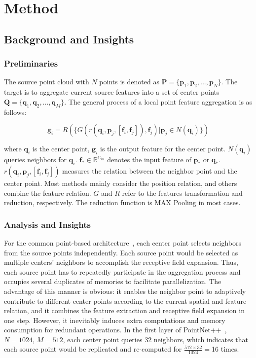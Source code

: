\documentclass[journal]{IEEEtran}
\begin{document}
\section{Method}

\subsection{Background and Insights}
\label{sec:analysis}

\subsubsection{Preliminaries} The source point cloud with $N$ points is denoted as $\mathbf{P}=\{\mathbf{p}_1, \mathbf{p}_2, ..., \mathbf{p}_N\}$. The target is to aggregate current source features into a set of center points $\mathbf{Q}=\{\mathbf{q}_1, \mathbf{q}_2, ..., \mathbf{q}_M\}$. The general process of a local point feature aggregation is as follows:


\begin{equation}
\label{eq:conv}
\mathbf{g}_i = R(\{G(r(\mathbf{q}_{i}, \mathbf{p}_{j}, [\mathbf{f}_{i}, \mathbf{f}_{j}]), \mathbf{f}_j)|\mathbf{p}_{j}\in N(\mathbf{q}_i)\})
\end{equation}

\noindent
where $\mathbf{q}_i$ is the center point, $\mathbf{g}_i$ is the output feature for the center point. $N(\mathbf{q}_i)$ queries neighbors for $\mathbf{q}_i$. $\mathbf{f}_{*}\in\mathbb{R}^{C_{in}}$ denotes the input feature of $\mathbf{p}_{*}$ or $\mathbf{q}_{*}$. $r(\mathbf{q}_{i}, \mathbf{p}_{j}, [\mathbf{f}_{i}, \mathbf{f}_{j}])$ measures the relation between the neighbor point and the center point. Most methods mainly consider the position relation, and others combine the feature relation. $G$ and $R$ refer to the features transformation and reduction, respectively. The reduction function is MAX Pooling in most cases. 


\subsubsection{Analysis and Insights} For the common point-based architecture~\cite{PointNet++}, each center point selects neighbors from the source points independently. Each source point would be selected as multiple centers' neighbors to accomplish the receptive field expansion. Thus, each source point has to repeatedly participate in the aggregation process and occupies several duplicates of memories to facilitate parallelization. The advantage of this manner is obvious: it enables the neighbor point to adaptively contribute to different center points according to the current spatial and feature relation, and it combines the feature extraction and receptive field expansion in one step. However, it inevitably induces extra computations and memory consumption for redundant operations. In the first layer of PointNet++~\cite{PointNet++}, $N=1024$, $M=512$, each center point queries 32 neighbors, which indicates that each source point would be replicated and re-computed for $\frac{512\times32}{1024}=$16 times.
\end{document}
